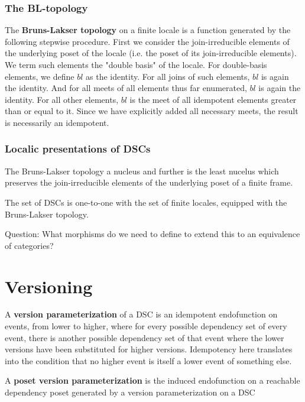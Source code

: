 \documentclass{beamer}
\begin{document}
\begin{frame}
\frametitle{The BL-topology}
\begin{definition}
The \textbf{Bruns-Lakser topology} on a finite locale is a function generated by the following stepwise procedure. First we consider the join-irreducible elements of the underlying poset of the locale (i.e. the poset of its join-irreducible elements). We term such elements the "double basis" of the locale. For double-basis elements, we define \(bl\) as the identity. For all joins of such elements, \(bl\) is again the identity. And for all meets of all elements thus far enumerated, \(bl\) is again the identity. For all other elements, \(bl\) is the meet of all idempotent elements greater than or equal to it. Since we have explicitly added all necessary meets, the result is necessarily an idempotent.
\end{definition}

\end{frame}

\begin{frame}
\frametitle{Localic presentations of DSCs}

\begin{lemma}
The Bruns-Lakser topology a nucleus and further is the least nucelus which preserves the join-irreducible elements of the underlying poset of a finite frame.
\end{lemma}

\begin{theorem}
The set of DSCs is one-to-one with the set of finite locales, equipped with the Bruns-Lakser topology.
\end{theorem}

Question: What morphisms do we need to define to extend this to an equivalence of categories?

\end{frame}

\section{Versioning}
\begin{frame}
\begin{definition}
A \textbf{version parameterization} of a DSC is an idempotent endofunction on events, from lower to higher, where for every possible dependency set of every event, there is another possible dependency set of that event where the lower versions have been substituted for higher versions. Idempotency here translates into the condition that no higher event is itself a lower event of something else.

A \textbf{poset version parameterization} is the induced endofunction on a reachable dependency poset generated by a version parameterization on a DSC
\end{definition}


\end{frame}
\end{document}
